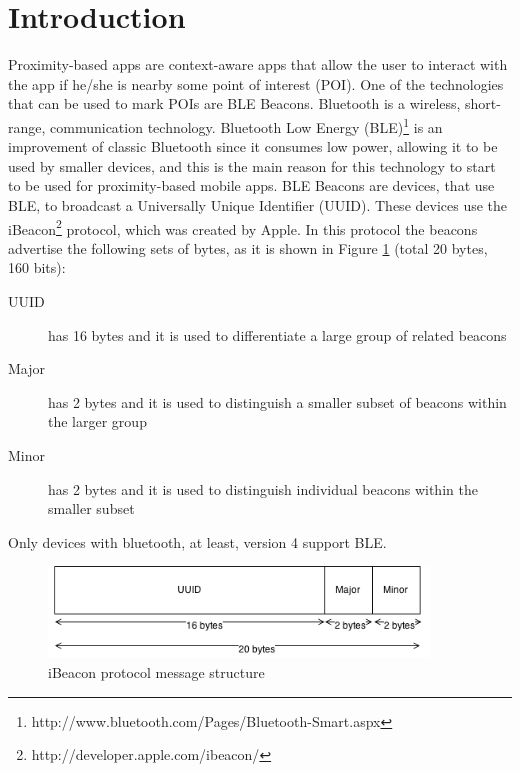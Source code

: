 
\section{Introduction}
\label{sec:introduction}
Proximity-based apps are
context-aware apps that allow the user to interact
with the app if he/she is nearby some point of interest (POI).
One of the technologies that can be used to mark POIs are BLE Beacons.
Bluetooth is a wireless, short-range, communication technology.
Bluetooth Low Energy (BLE)\footnote{http://www.bluetooth.com/Pages/Bluetooth-Smart.aspx}
\cite{ble}
is an improvement of classic Bluetooth since it consumes
low power, allowing it to be used by smaller devices,
and this is the main reason for this technology to start to
be used for proximity-based mobile apps.
BLE Beacons are devices, that use BLE, to broadcast a
Universally Unique Identifier (UUID).
These devices use the
iBeacon\footnote{http://developer.apple.com/ibeacon/}
protocol, which was created
by Apple\texttrademark. In this protocol the beacons
advertise the following sets of bytes, as it is shown in
Figure \ref{fig:ibeacon}
(total 20 bytes, 160 bits):
\begin{description}
  \item[UUID] has 16 bytes and it is used to differentiate a
  large group of related beacons
  \item[Major] has 2 bytes and it is used to distinguish a smaller
  subset of beacons within the larger group
  \item[Minor] has 2 bytes and it is used to distinguish individual
  beacons within the smaller subset
\end{description}
Only devices with bluetooth, at least, version 4 support BLE.

\begin{figure}[!ht]
  \centering
    \includegraphics[width=0.9\textwidth]{figures/ibeacon}
    \caption{iBeacon protocol message structure}
    \label{fig:ibeacon}
\end{figure}


